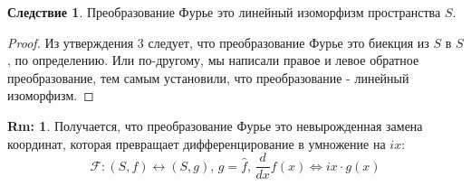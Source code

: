 \documentclass[12pt]{article}
\theoremstyle{definition}
\newtheorem{rem}{Rm:}
\newtheorem{corollary}{Следствие}
\newcommand{\wht}[1]{\widehat{#1}}
\begin{document}
\begin{corollary}
	Преобразование Фурье это линейный изоморфизм пространства $S$.
\end{corollary}
\begin{proof}
	Из утверждения $3$ следует, что преобразование Фурье это биекция из $S$ в $S$, по определению. Или по-другому, мы написали правое и левое обратное преобразование, тем самым установили, что преобразование - линейный изоморфизм.
\end{proof}
\begin{rem}
	Получается, что преобразование Фурье это невырожденная замена координат, которая превращает дифференцирование в умножение на $ix$:
	$$
		\mathcal{F}\colon (S,f) \leftrightarrow (S,g), \, g = \wht{f}, \,  \dfrac{d}{dx}f(x) \Leftrightarrow ix{\cdot}g(x)
	$$
\end{rem}
\end{document}

